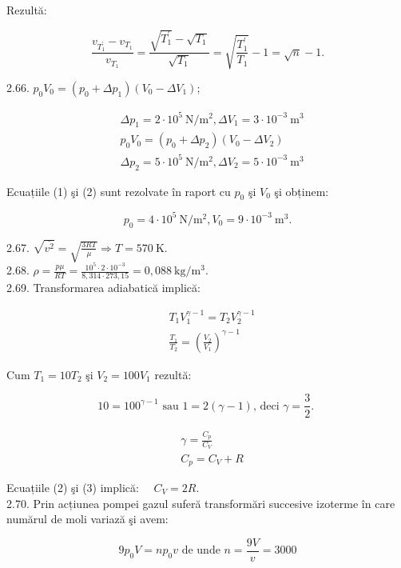 \documentclass[10pt]{article}
\begin{document}
Rezultă:

$$
\frac{v_{T_{1}^{\prime}}-v_{T_{1}}}{v_{T_{1}}}=\frac{\sqrt{T_{1}^{\prime}}-\sqrt{T_{1}}}{\sqrt{T_{1}}}=\sqrt{\frac{T_{1}^{\prime}}{T_{1}}}-1=\sqrt{n}-1 .
$$

2.66. $p_{0} V_{0}=\left(p_{0}+\Delta p_{1}\right)\left(V_{0}-\Delta V_{1}\right)$;


\begin{align*}
& \Delta p_{1}=2 \cdot 10^{5} \mathrm{~N} / \mathrm{m}^{2}, \Delta V_{1}=3 \cdot 10^{-3} \mathrm{~m}^{3}  \tag{1}\\
& p_{0} V_{0}=\left(p_{0}+\Delta p_{2}\right)\left(V_{0}-\Delta V_{2}\right)  \tag{2}\\
& \Delta p_{2}=5 \cdot 10^{5} \mathrm{~N} / \mathrm{m}^{2}, \Delta V_{2}=5 \cdot 10^{-3} \mathrm{~m}^{3}
\end{align*}


Ecuațiile (1) şi (2) sunt rezolvate în raport cu $p_{0}$ şi $V_{0}$ şi obținem:

$$
p_{0}=4 \cdot 10^{5} \mathrm{~N} / \mathrm{m}^{2}, V_{0}=9 \cdot 10^{-3} \mathrm{~m}^{3} .
$$

2.67. $\sqrt{\overline{v^{2}}}=\sqrt{\frac{3 R T}{\mu}} \Rightarrow T=570 \mathrm{~K}$.\\
2.68. $\rho=\frac{p \mu}{R T}=\frac{10^{5} \cdot 2 \cdot 10^{-3}}{8,314 \cdot 273,15}=0,088 \mathrm{~kg} / \mathrm{m}^{3}$.\\
2.69. Transformarea adiabatică implică:


\begin{align*}
& T_{1} V_{1}^{\gamma-1}=T_{2} V_{2}^{\gamma-1}  \tag{1}\\
& \frac{T_{1}}{T_{2}}=\left(\frac{V_{2}}{V_{1}}\right)^{\gamma-1}
\end{align*}


Cum $T_{1}=10 T_{2}$ şi $V_{2}=100 V_{1}$ rezultă:

$$
10=100^{\gamma-1} \text { sau } 1=2(\gamma-1) \text {, deci } \gamma=\frac{3}{2} \text {. }
$$


\begin{align*}
& \gamma=\frac{C_{p}}{C_{V}}  \tag{2}\\
& C_{p}=C_{V}+R \tag{3}
\end{align*}


Ecuațiile (2) şi (3) implică: $\quad C_{V}=2 R$.\\
2.70. Prin acțiunea pompei gazul suferă transformări succesive izoterme în care numărul de moli variază şi avem:

$$
9 p_{0} V=n p_{0} v \text { de unde } n=\frac{9 V}{v}=3000
$$
\end{document}

